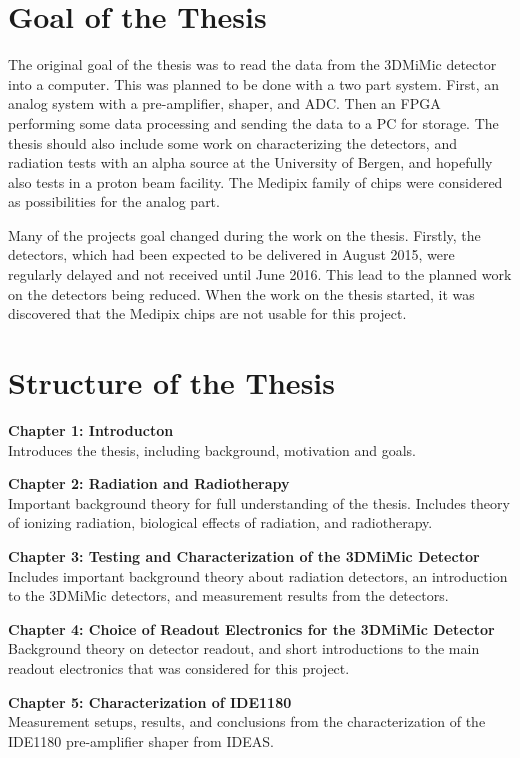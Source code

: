 \documentclass[../main/thesis.tex]{subfiles}
\begin{document}
\section{Goal of the Thesis}
\label{i-goal}

The original goal of the thesis was to read the data from the 3DMiMic detector into a computer. This was planned to be done with a two part system. First, an analog system with a pre-amplifier, shaper, and ADC. Then an FPGA performing some data processing and sending the data to a PC for storage. The thesis should also include some work on characterizing the detectors, and radiation tests with an alpha source at the University of Bergen, and hopefully also tests in a proton beam facility. The Medipix family of chips were considered as possibilities for the analog part.

Many of the projects goal changed during the work on the thesis. Firstly, the detectors, which had been expected to be delivered in August 2015, were regularly delayed and not received until June 2016. This lead to the planned work on the detectors being reduced. When the work on the thesis started, it was discovered that the Medipix chips are not usable for this project. 


\section{Structure of the Thesis}
\label{i-structure}
\textbf{Chapter 1: Introducton}\\
Introduces the thesis, including background, motivation and goals.

\textbf{Chapter 2: Radiation and Radiotherapy}\\
Important background theory for full understanding of the thesis. Includes theory of ionizing radiation, biological effects of radiation, and radiotherapy.

\textbf{Chapter 3: Testing and Characterization of the 3DMiMic Detector}\\
Includes important background theory about radiation detectors, an introduction to the 3DMiMic detectors, and measurement results from the detectors.

\textbf{Chapter 4: Choice of Readout Electronics for the 3DMiMic Detector}\\
Background theory on detector readout, and short introductions to the main readout electronics that was considered for this project.

\textbf{Chapter 5: Characterization of IDE1180}\\
Measurement setups, results, and conclusions from the characterization of the IDE1180 pre-amplifier shaper from IDEAS.
\end{document}
